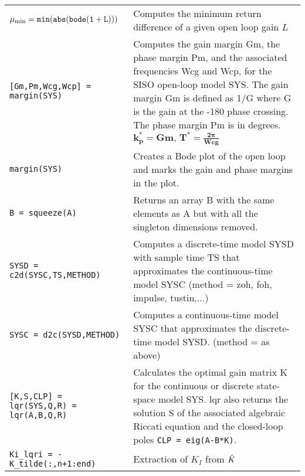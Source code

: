 \begin{center}
{\begin{tabular}{p{5cm}|p{8.5cm}}
        $\mathtt{\mu_{\textnormal{min}} = min( abs(bode(1 + L)))}$ &  Computes the minimum return difference of a given open loop gain $L$\\
        
        \texttt{[Gm,Pm,Wcg,Wcp] = margin(SYS)}  & Computes the gain margin Gm, the phase margin Pm, and the associated frequencies Wcg and Wcp, for the SISO open-loop model SYS. The gain margin Gm is defined as 1/G where G is the gain at the -180 phase crossing. The phase margin Pm is in degrees. $\mathbf{k_p^* = Gm, \, T^* = \frac{2\pi}{Wcg}}$\\
        
        \texttt{margin(SYS)} & Creates a Bode plot of the open loop and marks the gain and phase margins in the plot. \\
        
        \texttt{B = squeeze(A)}  &  Returns an array B with the same elements as A but with all the singleton dimensions removed.\\
        
        \texttt{SYSD = c2d(SYSC,TS,METHOD)}  &  Computes a discrete-time model SYSD with sample time TS that approximates the continuous-time model SYSC (method = zoh, foh, impulse, tustin,...)\\
        
        \texttt{SYSC = d2c(SYSD,METHOD)} & Computes a continuous-time model SYSC that approximates the discrete-time model SYSD. (method = as above)\\
        
        \texttt{[K,S,CLP] = lqr(SYS,Q,R) = lqr(A,B,Q,R)} & Calculates the optimal gain matrix K for the continuous or discrete state-space model SYS. lqr also returns the solution S of the associated algebraic Riccati equation and the closed-loop poles \texttt{CLP = eig(A-B*K)}.\\
        
        \texttt{Ki\_lqri = -K\_tilde(:,n+1:end)} & Extraction of $K_I$ from $\Tilde{K}$
    \end{tabular}
}
\end{center}


\newpage

